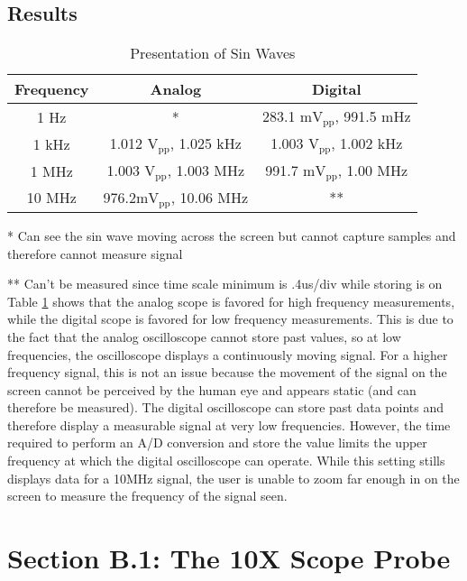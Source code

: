 \documentclass[12pt,letterpaper]{report}
\begin{document}
\subsection*{Results}
\begin{table}[ht]
\caption{Presentation of Sin Waves} %
\centering 
    \begin{tabular}{| c | c | c |}
    \hline  
    Frequency & Analog & Digital \\
    \hline
    1 Hz & * & 283.1 m$\text{V}_{\text{pp}}$, 991.5 mHz \\
    1 kHz & 1.012 $\text{V}_{\text{pp}}$, 1.025 kHz & 1.003 $\text{V}_{\text{pp}}$, 1.002 kHz \\
    1 MHz & 1.003 $\text{V}_{\text{pp}}$, 1.003 MHz & 991.7 m$\text{V}_{\text{pp}}$, 1.00 MHz \\
    10 MHz & 976.2m$\text{V}_{\text{pp}}$, 10.06 MHz & ** \\
    \hline
    \end{tabular}
    \label{table:SinWave}
\end{table}
* Can see the sin wave moving across the screen but cannot capture samples and therefore cannot measure signal

** Can't be measured since time scale minimum is .4us/div while storing is on
\\[.1in]
Table \ref{table:SinWave} shows that the analog scope is favored for high frequency measurements, while the digital scope is favored for low frequency measurements. This is due to the fact that the analog oscilloscope cannot store past values, so at low frequencies, the oscilloscope displays a continuously moving signal. For a higher frequency signal, this is not an issue because the movement of the signal on the screen cannot be perceived by the human eye and appears static (and can therefore be measured). The digital oscilloscope can store past data points and therefore display a measurable signal at very low frequencies. However, the time required to perform an A/D conversion and store the value limits the upper frequency at which the digital oscilloscope can operate. While this setting stills displays data for a 10MHz signal, the user is unable to zoom far enough in on the screen to measure the frequency of the signal seen.

\section*{Section B.1: The 10X Scope Probe}
\end{document}
